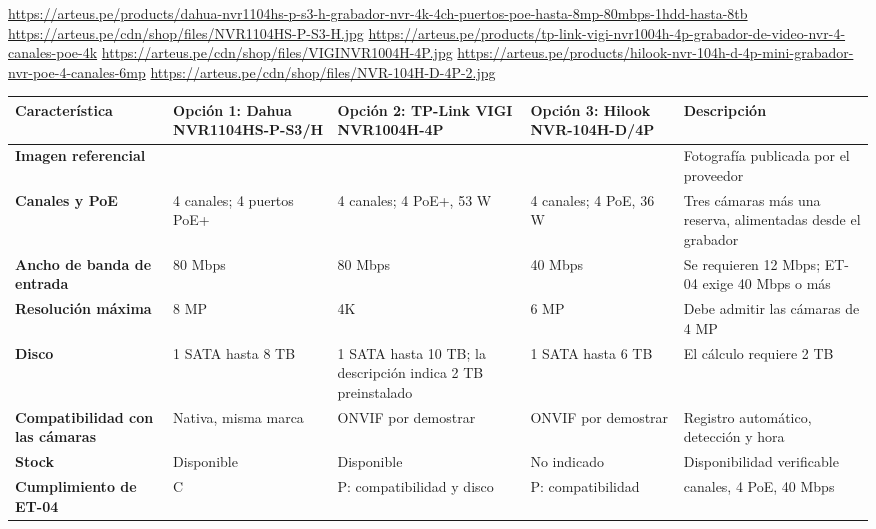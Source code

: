 \begin{landscape}
\urldef{\cotubi}\url{https://arteus.pe/products/dahua-nvr1104hs-p-s3-h-grabador-nvr-4k-4ch-puertos-poe-hasta-8mp-80mbps-1hdd-hasta-8tb}
\urldef{\cotubj}\url{https://arteus.pe/cdn/shop/files/NVR1104HS-P-S3-H.jpg}
\urldef{\cotubk}\url{https://arteus.pe/products/tp-link-vigi-nvr1004h-4p-grabador-de-video-nvr-4-canales-poe-4k}
\urldef{\cotubl}\url{https://arteus.pe/cdn/shop/files/VIGINVR1004H-4P.jpg}
\urldef{\cotubm}\url{https://arteus.pe/products/hilook-nvr-104h-d-4p-mini-grabador-nvr-poe-4-canales-6mp}
\urldef{\cotubn}\url{https://arteus.pe/cdn/shop/files/NVR-104H-D-4P-2.jpg}
\par\noindent\begin{minipage}{\linewidth}\formatofichas\scriptsize\renewcommand{\arraystretch}{1.0}
\label{tab:cot-nvr}
\begin{tabularx}{\linewidth}{@{}>{\raggedright\arraybackslash}p{3.0cm}YYY>{\raggedright\arraybackslash}p{4.4cm}@{}}
\toprule
\textbf{Característica} & \textbf{Opción 1: Dahua NVR1104HS-P-S3/H} & \textbf{Opción 2: TP-Link VIGI NVR1004H-4P} & \textbf{Opción 3: Hilook NVR-104H-D/4P} & \textbf{Descripción}\\\midrule
\textbf{Imagen referencial} &  &  &  & Fotografía publicada por el proveedor\\
\textbf{Canales y PoE} & 4 canales; 4 puertos PoE+ & 4 canales; 4 PoE+, 53 W & 4 canales; 4 PoE, 36 W & Tres cámaras más una reserva, alimentadas desde el grabador\\
\textbf{Ancho de banda de entrada} & 80 Mbps & 80 Mbps & 40 Mbps & Se requieren 12 Mbps; ET-04 exige 40 Mbps o más\\
\textbf{Resolución máxima} & 8 MP & 4K & 6 MP & Debe admitir las cámaras de 4 MP\\
\textbf{Disco} & 1 SATA hasta 8 TB & 1 SATA hasta 10 TB; la descripción indica 2 TB preinstalado & 1 SATA hasta 6 TB & El cálculo requiere 2 TB\\
\textbf{Compatibilidad con las cámaras} & Nativa, misma marca & ONVIF por demostrar & ONVIF por demostrar & Registro automático, detección y hora\\
\textbf{Stock} & Disponible & Disponible & No indicado & Disponibilidad verificable\\
\textbf{Cumplimiento de ET-04} & C & P: compatibilidad y disco & P: compatibilidad & 4 canales, 4 PoE, 40 Mbps\\

\end{tabularx}
\end{minipage}
\end{landscape}
